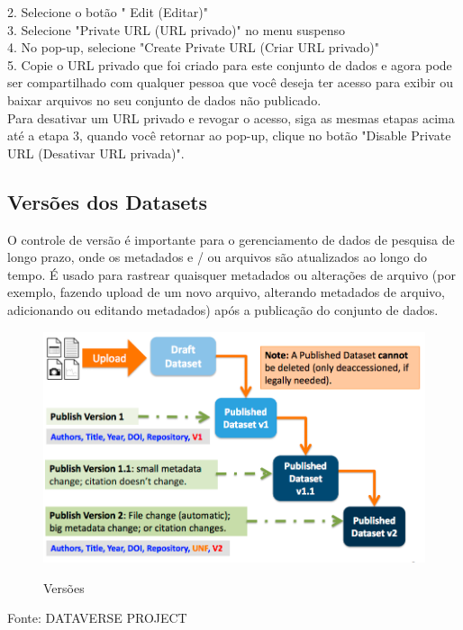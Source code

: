\documentclass[12pt,hidelinks]{article}
\begin{document}
2. Selecione o botão " Edit (Editar)"\\

3. Selecione "Private URL (URL privado)" no menu suspenso\\

4. No pop-up, selecione "Create Private URL (Criar URL privado)"\\

5. Copie o URL privado que foi criado para este conjunto de dados e agora pode ser compartilhado com qualquer pessoa que você deseja ter acesso para exibir ou baixar arquivos no seu conjunto de dados não publicado.\\

Para desativar um URL privado e revogar o acesso, siga as mesmas etapas acima até a etapa 3, quando você retornar ao pop-up, clique no botão "Disable Private URL (Desativar URL privada)".
    
    \subsection{Versões dos Datasets}
    
\qquad O controle de versão é importante para o gerenciamento de dados de pesquisa de longo prazo, onde os metadados e / ou arquivos são atualizados ao longo do tempo. É usado para rastrear quaisquer metadados ou alterações de arquivo (por exemplo, fazendo upload de um novo arquivo, alterando metadados de arquivo, adicionando ou editando metadados) após a publicação do conjunto de dados.

\begin{figure}[H]
    \caption{Versões}
    \centering
      \includegraphics[scale=0.4]{ver.png}
    \label{Versão}
 \end{figure}
\noindent Fonte: DATAVERSE PROJECT\\
    
\end{document}
